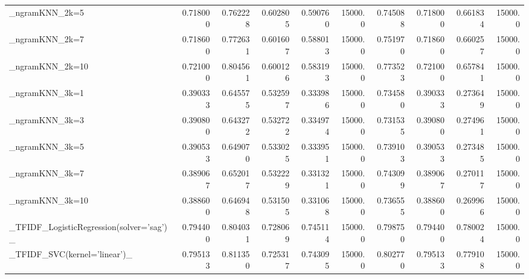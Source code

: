 \begin{tabular}{lrrrrrrrrr}
\_ngramKNN\_2k=5                                     &  0.718000 &         0.762228 &      0.602805 &        0.590760 &        15000.0 &            0.745088 &         0.718000 &           0.661834 &           15000.0 \\
\_ngramKNN\_2k=7                                     &  0.718600 &         0.772631 &      0.601607 &        0.588013 &        15000.0 &            0.751970 &         0.718600 &           0.660257 &           15000.0 \\
\_ngramKNN\_2k=10                                    &  0.721000 &         0.804561 &      0.600126 &        0.583193 &        15000.0 &            0.773523 &         0.721000 &           0.657841 &           15000.0 \\
\_ngramKNN\_3k=1                                     &  0.390333 &         0.645575 &      0.532597 &        0.333986 &        15000.0 &            0.734580 &         0.390333 &           0.273649 &           15000.0 \\
\_ngramKNN\_3k=3                                     &  0.390800 &         0.643272 &      0.532722 &        0.334974 &        15000.0 &            0.731535 &         0.390800 &           0.274961 &           15000.0 \\
\_ngramKNN\_3k=5                                     &  0.390533 &         0.649070 &      0.533025 &        0.333951 &        15000.0 &            0.739103 &         0.390533 &           0.273485 &           15000.0 \\
\_ngramKNN\_3k=7                                     &  0.389067 &         0.652017 &      0.532229 &        0.331321 &        15000.0 &            0.743099 &         0.389067 &           0.270117 &           15000.0 \\
\_ngramKNN\_3k=10                                    &  0.388600 &         0.646948 &      0.531505 &        0.331068 &        15000.0 &            0.736555 &         0.388600 &           0.269966 &           15000.0 \\
\_TFIDF\_LogisticRegression(solver='sag')\_           &  0.794400 &         0.804031 &      0.728069 &        0.745114 &        15000.0 &            0.798750 &         0.794400 &           0.780024 &           15000.0 \\
\_TFIDF\_SVC(kernel='linear')\_                       &  0.795133 &         0.811350 &      0.725317 &        0.743095 &        15000.0 &            0.802770 &         0.795133 &           0.779108 &           15000.0 \\

\end{tabular}
